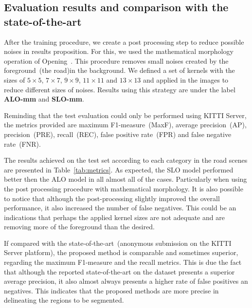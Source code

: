 {\color{green}{Adicionar informacao sobre os resultados do conjunto de testes}}

\subsection{Evaluation results and comparison with the state-of-the-art}

After the training procedure, we create a post processing step to reduce possible noises in results proposition. For this, we used the mathematical morphology operation of Opening~\cite{najman13}. This procedure removes small noises created by the foreground~(the road)in the background. We defined a set of kernels with the sizes of $5\times5$, $7\times7$, $9\times9$, $11\times11$ and $13\times13$ and applied in the images to reduce different sizes of noises. Results using this strategy are under the label \textbf{ALO-mm} and \textbf{SLO-mm}.

Reminding that the test evaluation could only be performed using KITTI Server, the metrics provided are maximum F1-measure~(MaxF), average precision~(AP), precision~(PRE), recall~(REC), false positive rate~(FPR) and false negative rate~(FNR). 

The results achieved  on the test set according to each category in the road scenes are presented in Table~\ref{tab:metrics}. As expected, the SLO model performed better then the ALO model in all almost all of the cases. Particularly when using the post processing procedure with mathematical morphology. It is also possible to notice that although the post-processing slightly improved the overall performance, it also increased the number of false negatives. This could be an indications that perhaps the applied kernel sizes are not adequate and are removing more of the foreground than the desired.   

If compared with the state-of-the-art~(anonymous submission on the KITTI Server platform), the proposed method is comparable and sometimes superior, regarding the maximum F1-measure and the recall metrics. This is due the fact that although the reported state-of-the-art on the dataset presents a superior average precision, it also almost always presents a higher rate of false positives an negatives. This indicates that the proposed methods are more precise in delineating the regions to be segmented.       





